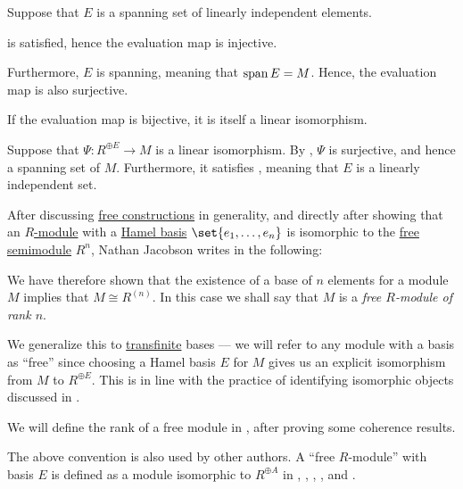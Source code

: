 \begin{defproof}
   Suppose that \( E \) is a spanning set of linearly independent elements.

   is satisfied, hence the evaluation map is injective.

  Furthermore, \( E \) is spanning, meaning that \( \operatorname{span} E = M \). Hence, the evaluation map is also surjective.

   If the evaluation map is bijective, it is itself a linear isomorphism.

   Suppose that \( \Psi: R^{\oplus E} \to M \) is a linear isomorphism. By , \( \Psi \) is surjective, and hence a spanning set of \( M \). Furthermore, it satisfies , meaning that \( E \) is a linearly independent set.
\end{defproof}

\begin{remark}\label{rem:free_module}
  After discussing \hyperref[con:free_construction]{free constructions} in generality, and directly after showing that an \hyperref[def:module]{\( R \)-module} with a \hyperref[def:hamel_basis]{Hamel basis} \( \set{ e_1, \ldots, e_n } \)  is isomorphic to the \hyperref[def:free_semimodule]{free semimodule} \( R^n \), Nathan Jacobson writes in \cite[171]{Jacobson1985BasicAlgebraI} the following:
  \begin{displayquote}
    We have therefore shown that the existence of a base of \( n \) elements for a module \( M \) implies that \( M \cong R^{(n)} \). In this case we shall say that \( M \) is a \textit{free \( R \)-module of rank \( n \)}.
  \end{displayquote}

  We generalize this to \hyperref[con:transfinitum]{transfinite} bases --- we will refer to any module with a basis as \enquote{free} since choosing a Hamel basis \( E \) for \( M \) gives us an explicit isomorphism from \( M \) to \( R^{\oplus E} \). This is in line with the practice of identifying isomorphic objects discussed in .

  We will define the rank of a free module in , after proving some coherence results.
\end{remark}
\begin{comments}
  \item The above convention is also used by other authors. A \enquote{free \( R \)-module} with basis \( E \) is defined as a module isomorphic to \( R^{\oplus A} \) in
  \cite[def. II.1.10]{Bourbaki1998Algebra1to3},
  \cite[135]{Lang2002Algebra},
  \cite[329]{Rotman2015AdvancedModernAlgebraPart1},
  \cite[169]{Aluffi2009Algebra},
  \cite[405]{Knapp2016BasicAlgebra} and
  \cite[47]{Шафаревич1999ОсновныеПонятияАлгебры}.
\end{comments}

